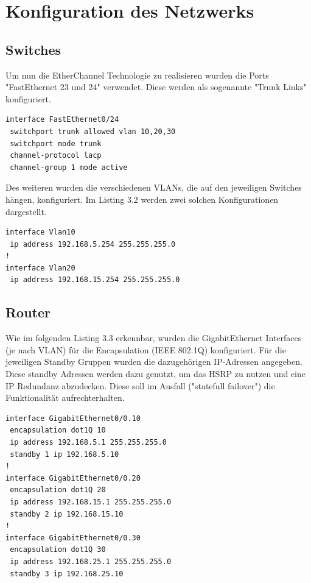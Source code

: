 \chapter{Konfiguration des Netzwerks}

\section{Switches}

Um nun die EtherChannel Technologie zu realisieren wurden die Ports "FastEthernet 23 und 24" verwendet. Diese werden als sogenannte "Trunk Links" konfiguriert.

\begin{lstlisting}[caption={Setting EtherChannel on a switch},label={lst:etherchannel},language={}]
interface FastEthernet0/24
 switchport trunk allowed vlan 10,20,30
 switchport mode trunk
 channel-protocol lacp
 channel-group 1 mode active
\end{lstlisting}

Des weiteren wurden die verschiedenen \ac{VLAN}s, die auf den jeweiligen Switches hängen, konfiguriert. Im Listing 3.2 werden zwei solchen Konfigurationen dargestellt.

\begin{lstlisting}[caption={VLAN Konfiguration auf Switch 1},label={lst:etherchannel},language={}]
interface Vlan10
 ip address 192.168.5.254 255.255.255.0
!
interface Vlan20
 ip address 192.168.15.254 255.255.255.0

\end{lstlisting}

\section{Router}
Wie im folgenden Listing 3.3 erkennbar, wurden die GigabitEthernet Interfaces (je nach \ac{VLAN}) für die Encapsulation (IEEE 802.1Q) konfiguriert. Für die jeweiligen Standby Gruppen wurden die dazugehörigen IP-Adressen angegeben. 
Diese standby Adressen werden dazu genutzt, um das \ac{HSRP} zu nutzen und eine IP Redundanz abzudecken. Diese soll im Ausfall ("statefull failover") die Funktionalität aufrechterhalten.

\begin{lstlisting}[caption={Konfiguration auf Router 1},label={lst:routerconfig},language={}]
interface GigabitEthernet0/0.10
 encapsulation dot1Q 10
 ip address 192.168.5.1 255.255.255.0
 standby 1 ip 192.168.5.10
!
interface GigabitEthernet0/0.20
 encapsulation dot1Q 20
 ip address 192.168.15.1 255.255.255.0
 standby 2 ip 192.168.15.10
!
interface GigabitEthernet0/0.30
 encapsulation dot1Q 30
 ip address 192.168.25.1 255.255.255.0
 standby 3 ip 192.168.25.10

\end{lstlisting}

